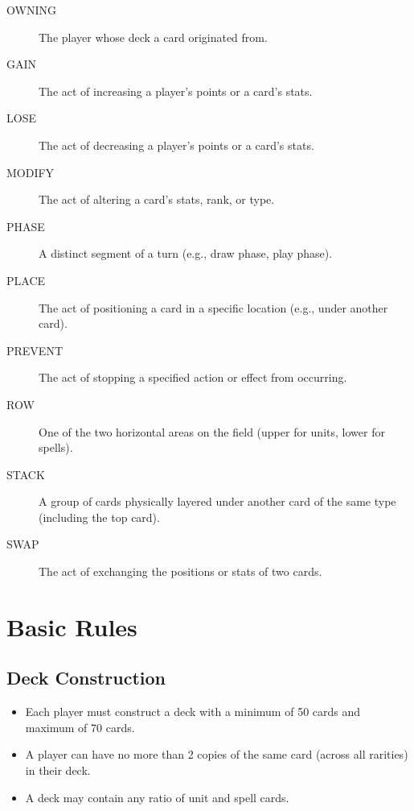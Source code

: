 \begin{description}
    \item[OWNING] The player whose deck a card originated from.
    \item[GAIN] The act of increasing a player’s points or a card’s stats.
    \item[LOSE] The act of decreasing a player’s points or a card’s stats.
    \item[MODIFY] The act of altering a card’s stats, rank, or type.
    \item[PHASE] A distinct segment of a turn (e.g., draw phase, play phase).
    \item[PLACE] The act of positioning a card in a specific location (e.g., under another card).
    \item[PREVENT] The act of stopping a specified action or effect from occurring.
    \item[ROW] One of the two horizontal areas on the field (upper for units, lower for spells).
    \item[STACK] A group of cards physically layered under another card of the same type (including the top card).
    \item[SWAP] The act of exchanging the positions or stats of two cards.
\end{description}











\section{Basic Rules}

\subsection{Deck Construction}
\begin{itemize}
    \item Each player must construct a deck with a minimum of 50 cards and maximum of 70 cards.
    \item A player can have no more than 2 copies of the same card (across all rarities) in their deck.
    \item A deck may contain any ratio of unit and spell cards.
\end{itemize}





